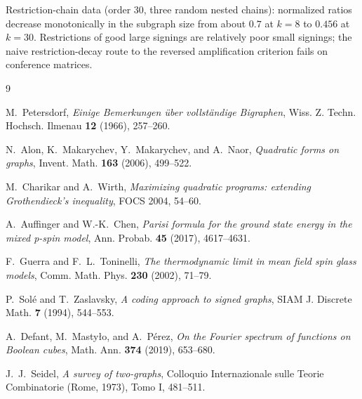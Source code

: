 \documentclass[11pt]{article}
\theoremstyle{remark}
\begin{document}
Restriction-chain data (order 30, three random nested chains):
normalized ratios decrease monotonically in the subgraph size from
about $0.7$ at $k=8$ to $0.456$ at $k=30$. Restrictions of good large
signings are relatively poor small signings; the naive
restriction-decay route to the reversed amplification criterion fails
on conference matrices.

\begin{thebibliography}{9}

M.~Petersdorf,
\emph{Einige Bemerkungen \"uber vollst\"andige Bigraphen},
Wiss. Z. Techn. Hochsch. Ilmenau \textbf{12} (1966), 257--260.

N.~Alon, K.~Makarychev, Y.~Makarychev, and A.~Naor,
\emph{Quadratic forms on graphs},
Invent. Math. \textbf{163} (2006), 499--522.

M.~Charikar and A.~Wirth,
\emph{Maximizing quadratic programs: extending Grothendieck's
inequality}, FOCS 2004, 54--60.

A.~Auffinger and W.-K.~Chen,
\emph{Parisi formula for the ground state energy in the mixed p-spin
model}, Ann. Probab. \textbf{45} (2017), 4617--4631.

F.~Guerra and F.~L.~Toninelli,
\emph{The thermodynamic limit in mean field spin glass models},
Comm. Math. Phys. \textbf{230} (2002), 71--79.

P.~Sol\'e and T.~Zaslavsky,
\emph{A coding approach to signed graphs},
SIAM J. Discrete Math. \textbf{7} (1994), 544--553.

A.~Defant, M.~Masty\l{}o, and A.~P\'erez,
\emph{On the Fourier spectrum of functions on Boolean cubes},
Math. Ann. \textbf{374} (2019), 653--680.

J.~J.~Seidel,
\emph{A survey of two-graphs},
Colloquio Internazionale sulle Teorie Combinatorie (Rome, 1973),
Tomo I, 481--511.

\end{thebibliography}
\end{document}
